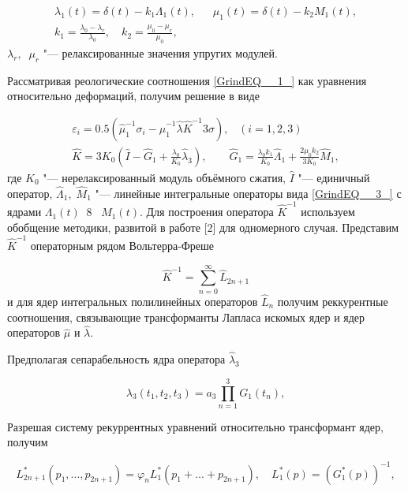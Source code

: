 \begin{equation} \label{GrindEQ__4_} \begin{array}{l} {\lambda _{1} (t)=\delta (t)-k_{1} \Lambda _{1} (t),\quad \; \; \mu _{1} (t)=\delta (t)-k_{2} M_{1} (t),} \\ {k_{1} =\frac{\lambda _{0} -\lambda _{r} }{\lambda _{0} } ,\quad k_{2} =\frac{\mu _{0} -\mu _{r} }{\mu _{0} } ,\quad } \end{array} \end{equation}
$\lambda _{r} ,\; \; \mu _{r} $ "--- релаксированные значения упругих модулей.

 Рассматривая реологические соотношения \eqref{GrindEQ__1_} как уравнения относительно деформаций, получим решение в виде

\begin{equation} \label{GrindEQ__5_} \begin{array}{l} {\varepsilon _{i} =0.5(\hat{\mu }_{1} ^{-1} \sigma _{i} -\hat{\mu }_{1} ^{-1} \hat{\lambda }\hat{K}^{-1} 3\sigma ),\; \; \; (i=1,2,3)} \\ {\hat{K}=3K_{0} \left(\hat{I}-\hat{G}_{1} +\frac{\lambda _{0} }{K_{0} } \hat{\lambda }_{3} \right),\quad \quad \hat{G}_{1} =\frac{\lambda _{0} k_{1} }{K_{0} } \hat{\Lambda }_{1} +\frac{2\mu _{0} k_{2} }{3K_{0} } \hat{M}_{1} ,} \end{array} \end{equation}
где $K_{0} $ "--- нерелаксированный модуль объёмного сжатия, $\hat{I}$ "--- единичный оператор, $\hat{\Lambda }_{1} ,\; \hat{M}_{1} $ "--- линейные интегральные операторы вида \eqref{GrindEQ__3_} с ядрами $\Lambda _{1} (t)\; \; 8\; \; \; M_{1} (t)$.  Для построения оператора $\hat{K}^{-1} $ используем обобщение методики, развитой в работе [2] для одномерного случая. Представим $\hat{K}^{-1} $ операторным рядом Вольтерра-Фреше

\[\hat{K}^{-1} =\sum _{n=0}^{\infty }\hat{L}_{2n+1}  \]
и для ядер интегральных полилинейных операторов $\hat{L}_{n} $ получим реккурентные соотношения, связывающие трансформанты Лапласа искомых ядер и ядер операторов $\hat{\mu }$ и $\hat{\lambda }$.

 Предполагая сепарабельность ядра оператора $\hat{\lambda }_{3} $

\[\lambda _{3} (t_{1} ,t_{2} ,t_{3} )=a_{3} \prod _{n=1}^{3}G_{1}  (t_{n} ),\]

Разрешая систему рекуррентных уравнений относительно трансформант ядер, получим

\begin{equation} \label{GrindEQ__6_} L^{*} _{2n+1} (p_{1} ,...,p_{2n+1} )=\varphi _{n} L_{1}^{*} (p_{1} +...+p_{2n+1} ),\quad L_{1}^{*} (p)=\left(G_{1}^{*} (p)\right)^{-1} , \end{equation}

